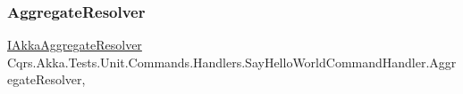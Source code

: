 \subsubsection{\texorpdfstring{Aggregate\+Resolver}{AggregateResolver}}
{\footnotesize\ttfamily \hyperlink{interfaceCqrs_1_1Akka_1_1Domain_1_1IAkkaAggregateResolver}{I\+Akka\+Aggregate\+Resolver} Cqrs.\+Akka.\+Tests.\+Unit.\+Commands.\+Handlers.\+Say\+Hello\+World\+Command\+Handler.\+Aggregate\+Resolver\hspace{0.3cm}{\ttfamily [get]}, {\ttfamily [protected]}}

